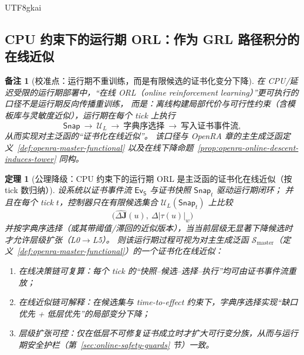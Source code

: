 \documentclass[12pt]{article}
\newtheorem{theorem}{定理}[section]
\newtheorem{remark}{备注}[section]
\begin{document}
\begin{CJK*}{UTF8}{gkai}
\subsection{CPU 约束下的运行期 ORL：作为 GRL 路径积分的在线近似}
\label{sec:calibration-cpu-orl-online-approx}

\begin{remark}[校准点：运行期不重训练，而是有限候选的证书化变分下降]
在 CPU/延迟受限的运行期部署中，“在线 \textsf{ORL}（online reinforcement learning）”更可执行的口径不是运行期反向传播重训练，
而是：离线构建局部代价与可行性约束（含模板库与灵敏度近似），运行期在每个 tick 上执行
\[
  \mathsf{Snap}\ \to\ \mathcal{U}_L\ \to\ \text{字典序选择}\ \to\ \text{写入证书事件流},
\]
从而实现对主泛函的“证书化在线近似”。
该口径与 OpenRA 章的主生成泛函定义~\ref{def:openra-master-functional} 以及在线下降命题~\ref{prop:openra-online-descent-induces-tower} 同构。
\end{remark}

\begin{theorem}[公理降级：CPU 约束下的运行期 ORL 是主泛函的证书化在线近似（按 tick 数归纳）]
\label{thm:cpu-bounded-orl-online-approx}
设系统以证书事件流 $\mathsf{Ev}_{\mathsf{S}}$ 与证书快照 $\mathsf{Snap}_t$ 驱动运行期闭环；
并且在每个 tick $t$，控制器只在有限候选集合 $\mathcal{U}_L(\mathsf{Snap}_t)$ 上比较
\[
  \bigl(\widehat{\Delta\mathbf{J}}(u),\ \Delta|\tau(u)|_w\bigr)
\]
并按字典序选择（或其带阈值/滞回的近似版本），当当前层级无显著下降候选时才允许层级扩张（L0$\to$L5）。
则该运行期过程可视为对主生成泛函 $\mathcal{S}_{\mathrm{master}}$（定义~\ref{def:openra-master-functional}）的一个证书化在线近似：
\begin{enumerate}
  \item 在线决策链可复算：每个 tick 的“快照--候选--选择--执行”均可由证书事件流重放；
  \item 在线近似链可解释：在候选集与 time-to-effect 约束下，字典序选择实现“缺口优先 + 低层优先”的局部变分下降；
  \item 层级扩张可控：仅在低层不可修复证书成立时才扩大可行变分族，从而与运行期安全护栏（第~\ref{sec:online-safety-guards} 节）一致。
\end{enumerate}
\end{theorem}


\end{CJK*}
\end{document}
